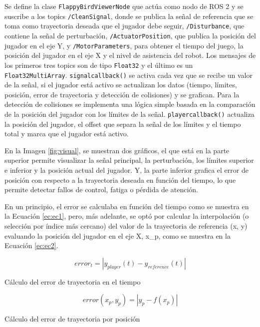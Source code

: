Se define la clase \verb|FlappyBirdViewerNode| que actúa como nodo de ROS 2 y se suscribe a los topics \verb|/CleanSignal|, donde se publica la señal de referencia que se toma como trayectoria deseada que el jugador debe seguir, \verb|/Disturbance|, que contiene la señal de perturbación, \verb|/ActuatorPosition|, que publica la posición del jugador en el eje Y, y \verb|/MotorParameters|, para obtener el tiempo del juego, la posición del jugador en el eje X y el nivel de asistencia del robot.
Los mensajes de los primeros tres topics son de tipo \verb|Float32| y el último es un \verb|Float32MultiArray|.
\verb|signalcallback()| se activa cada vez que se recibe un valor de la señal, si el jugador está activo se actualizan los datos (tiempo, límites, posición, error de trayectoria y detección de colisiones) y se grafican.
Para la detección de colisiones se implementa una lógica simple basada en la comparación de la posición del jugador con los límites de la señal.
\verb|playercallback()| actualiza la posición del jugador, el offset que separa la señal de los límites y el tiempo total y marca que el jugador está activo.

En la Imagen \ref{fig:visual}, se muestran dos gráficos, el que está en la parte superior permite visualizar la señal principal, la perturbación, los límites superior e inferior y la posición actual del jugador.
Y, la parte inferior grafica el error de posición con respecto a la trayectoria deseada en función del tiempo, lo que permite detectar fallos de control, fatiga o pérdida de atención.

En un principio, el error se calculaba en función del tiempo como se muestra en la Ecuación \ref{ec:ec1}, pero, más adelante, se optó por calcular la interpolación (o selección por índice más cercano) del valor de la trayectoria de referencia (x, y) evaluando la posición del jugador en el eje X, x\_p, como se muestra en la Ecuación \ref{ec:ec2}.

\begin{myequation}[h]
\begin{equation}
error_t = | y_{player}(t) - y_{reference}(t) |
\nonumber
\label{ec:ec1}
\end{equation}
\caption[Cálculo del error de trayectoria en el tiempo]{Cálculo del error de trayectoria en el tiempo}

\begin{equation}
error(x_p, y_p) = | y_p - f(x_p) |
\nonumber
\label{ec:ec2}
\end{equation}
\caption[Cálculo del error de trayectoria por posición]{Cálculo del error de trayectoria por posición}
\end{myequation}

